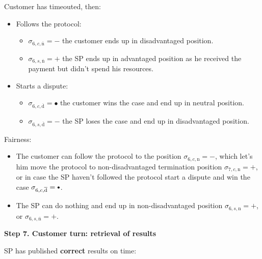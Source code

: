 \documentclass{ieeeaccess}
\newcommand\sbullet[1][.75]{\mathbin{\ThisStyle{\vcenter{\hbox{%
  \scalebox{#1}{$\SavedStyle\bullet$}}}}}%
}
\begin{document}
Customer has timeouted, then:

\begin{itemize}
\item
  Follows the protocol:

  \begin{itemize}
  
  \item
    \(\sigma_{6, c, \overline{\mathrm{n}}} = -\) the customer ends up in
    disadvantaged position.
  \item
    \(\sigma_{6, s, \overline{\mathrm{n}}} = +\) the SP ends up in
    advantaged position as he received the payment but didn't spend his
    resources.
  \end{itemize}
\item
  Starts a dispute:

  \begin{itemize}
  
  \item
    \(\sigma_{6, c, \overline{\mathrm{d}}} = •\) the customer wins the
    case and end up in neutral position.
  \item
    \(\sigma_{6, s, \overline{\mathrm{d}}} = -\) the SP loses the case
    and end up in disadvantaged position.
  \end{itemize}
\end{itemize}

Fairness:

\begin{itemize}

\item
  The customer can follow the protocol to the position
  \(\sigma_{6, c, \mathrm{n}} = -\), which let's him move the protocol
  to non-disadvantaged termination position
  \(\sigma_{7, c, \mathrm{n}} = +\), or in case the SP haven't followed
  the protocol start a dispute and win the case
  \(\sigma_{6, c, \overline{\mathrm{d}}} = \sbullet\).
\item
  The SP can do nothing and end up in non-disadvantaged position
  \(\sigma_{6, s, \mathrm{n}} = +\), or
  \(\sigma_{6, s, \overline{\mathrm{n}}} = +\).
\end{itemize}

\noindent \textbf
{Step 7. Customer turn: retrieval of results}\label{step-7-retrieval-of-results}

SP has published \textbf{correct} results on time:
\end{document}
